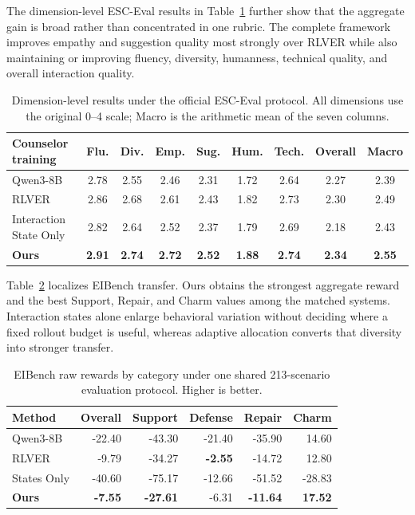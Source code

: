 \documentclass[letterpaper]{article}
\begin{document}
The dimension-level ESC-Eval results in Table~\ref{tab:esc-dimensions} further show that the aggregate gain is broad rather than concentrated in one rubric. The complete framework improves empathy and suggestion quality most strongly over RLVER while also maintaining or improving fluency, diversity, humanness, technical quality, and overall interaction quality.

\begin{table}[t]
\centering
\small
\begin{tabular}{lcccccccc}
\toprule
Counselor training & Flu. & Div. & Emp. & Sug. & Hum. & Tech. & Overall & Macro \\
\midrule
Qwen3-8B & 2.78 & 2.55 & 2.46 & 2.31 & 1.72 & 2.64 & 2.27 & 2.39 \\
RLVER & 2.86 & 2.68 & 2.61 & 2.43 & 1.82 & 2.73 & 2.30 & 2.49 \\
Interaction State Only & 2.82 & 2.64 & 2.52 & 2.37 & 1.79 & 2.69 & 2.18 & 2.43 \\
\textbf{Ours} & \textbf{2.91} & \textbf{2.74} & \textbf{2.72} & \textbf{2.52} & \textbf{1.88} & \textbf{2.74} & \textbf{2.34} & \textbf{2.55} \\
\bottomrule
\end{tabular}
\caption{Dimension-level results under the official ESC-Eval protocol. All dimensions use the original 0--4 scale; Macro is the arithmetic mean of the seven columns.}
\label{tab:esc-dimensions}
\end{table}

Table~\ref{tab:eibench-categories} localizes EIBench transfer. Ours obtains the strongest aggregate reward and the best Support, Repair, and Charm values among the matched systems. Interaction states alone enlarge behavioral variation without deciding where a fixed rollout budget is useful, whereas adaptive allocation converts that diversity into stronger transfer.

\begin{table}[t]
\centering
\small
\setlength{\tabcolsep}{2pt}
\begin{tabular}{lrrrrr}
\toprule
Method & Overall & Support & Defense & Repair & Charm \\
\midrule
Qwen3-8B & -22.40 & -43.30 & -21.40 & -35.90 & 14.60 \\
RLVER & -9.79 & -34.27 & \textbf{-2.55} & -14.72 & 12.80 \\
States Only & -40.60 & -75.17 & -12.66 & -51.52 & -28.83 \\
\textbf{Ours} & \textbf{-7.55} & \textbf{-27.61} & -6.31 & \textbf{-11.64} & \textbf{17.52} \\
\bottomrule
\end{tabular}
\caption{EIBench raw rewards by category under one shared 213-scenario evaluation protocol. Higher is better.}
\label{tab:eibench-categories}
\end{table}
\end{document}
